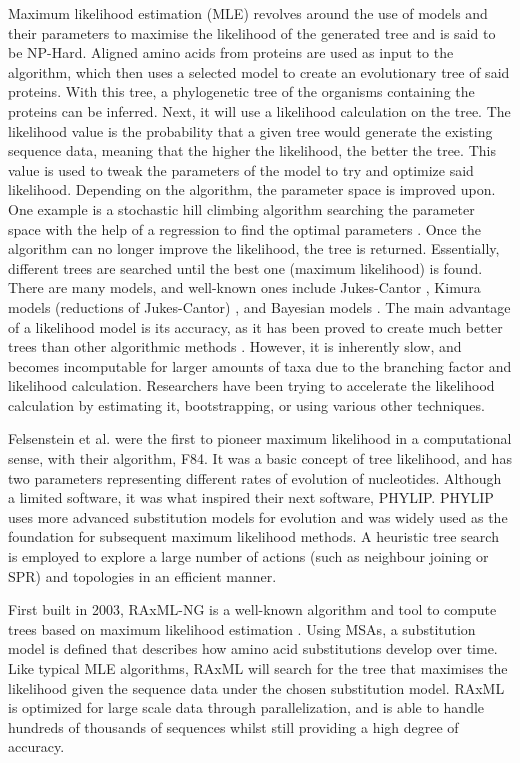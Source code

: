 \documentclass{mpaper}
\begin{document}
Maximum likelihood estimation (MLE) revolves around the use of models and their parameters to maximise the likelihood of the generated tree \cite{felsenstein1981evolutionary} and is said to be NP-Hard. Aligned amino acids from proteins are used as input to the algorithm, which then uses a selected model to create an evolutionary tree of said proteins. With this tree, a phylogenetic tree of the organisms containing the proteins can be inferred. Next, it will use a likelihood calculation on the tree. The likelihood value is the probability that a given tree would generate the existing sequence data, meaning that the higher the likelihood, the better the tree. This value is used to tweak the parameters of the model to try and optimize said likelihood. Depending on the algorithm, the parameter space is improved upon. One example is a stochastic hill climbing algorithm searching the parameter space with the help of a regression to find the optimal parameters \cite{nguyen2015iq}. Once the algorithm can no longer improve the likelihood, the tree is returned. Essentially, different trees are searched until the best one (maximum likelihood) is found. There are many models, and well-known ones include Jukes-Cantor \cite{erickson2010jukes}, Kimura models (reductions of Jukes-Cantor) \cite{huelsenbeck1995performance}, and Bayesian models \cite{bollback2002bayesian}. The main advantage of a likelihood model is its accuracy, as it has been proved to create much better trees than other algorithmic methods \cite{fasttree2}. However, it is inherently slow, and becomes incomputable for larger amounts of taxa due to the branching factor and likelihood calculation. Researchers have been trying to accelerate the likelihood calculation by estimating it, bootstrapping, or using various other techniques.

Felsenstein et al. \cite{felsenstein1981evolutionary} were the first to pioneer maximum likelihood in a computational sense, with their algorithm, F84. It was a basic concept of tree likelihood, and has two parameters representing different rates of evolution of nucleotides. Although a limited software, it was what inspired their next software, PHYLIP. PHYLIP \cite{felsenstein1993phylip} uses more advanced substitution models for evolution and was widely used as the foundation for subsequent maximum likelihood methods. A heuristic tree search is employed to explore a large number of actions (such as neighbour joining or SPR) and topologies in an efficient manner. 

First built in 2003, RAxML-NG is a well-known algorithm and tool to compute trees based on maximum likelihood estimation \cite{kozlov2019raxml}. Using MSAs, a substitution model is defined that describes how amino acid substitutions develop over time. Like typical MLE algorithms, RAxML will search for the tree that maximises the likelihood given the sequence data under the chosen substitution model. RAxML is optimized for large scale data through parallelization, and is able to handle hundreds of thousands of sequences whilst still providing a high degree of accuracy.
\end{document}
